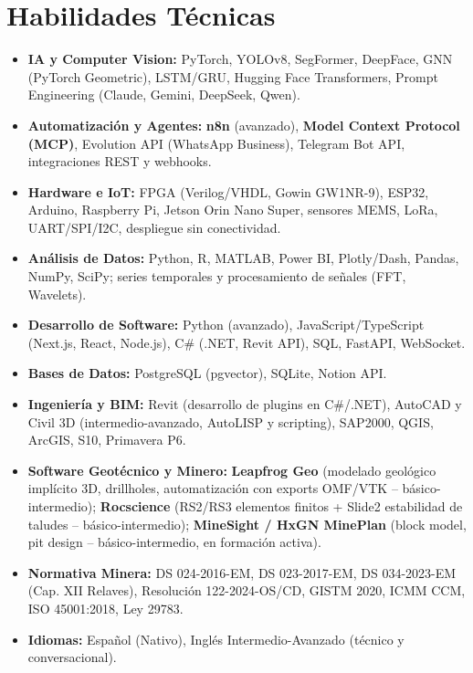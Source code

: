 \documentclass[10pt, a4paper]{article}
\begin{document}
\section*{Habilidades Técnicas}
\begin{itemize}
    \item \textbf{IA y Computer Vision:} PyTorch, YOLOv8, SegFormer, DeepFace, GNN (PyTorch Geometric), LSTM/GRU, Hugging Face Transformers, Prompt Engineering (Claude, Gemini, DeepSeek, Qwen).
    \item \textbf{Automatización y Agentes:} \textbf{n8n} (avanzado), \textbf{Model Context Protocol (MCP)}, Evolution API (WhatsApp Business), Telegram Bot API, integraciones REST y webhooks.
    \item \textbf{Hardware e IoT:} FPGA (Verilog/VHDL, Gowin GW1NR-9), ESP32, Arduino, Raspberry Pi, Jetson Orin Nano Super, sensores MEMS, LoRa, UART/SPI/I2C, despliegue sin conectividad.
    \item \textbf{Análisis de Datos:} Python, R, MATLAB, Power BI, Plotly/Dash, Pandas, NumPy, SciPy; series temporales y procesamiento de señales (FFT, Wavelets).
    \item \textbf{Desarrollo de Software:} Python (avanzado), JavaScript/TypeScript (Next.js, React, Node.js), C\# (.NET, Revit API), SQL, FastAPI, WebSocket.
    \item \textbf{Bases de Datos:} PostgreSQL (pgvector), SQLite, Notion API.
    \item \textbf{Ingeniería y BIM:} Revit (desarrollo de plugins en C\#/.NET), AutoCAD y Civil 3D (intermedio-avanzado, AutoLISP y scripting), SAP2000, QGIS, ArcGIS, S10, Primavera P6.
    \item \textbf{Software Geotécnico y Minero:} \textbf{Leapfrog Geo} (modelado geológico implícito 3D, drillholes, automatización con exports OMF/VTK -- básico-intermedio); \textbf{Rocscience} (RS2/RS3 elementos finitos + Slide2 estabilidad de taludes -- básico-intermedio); \textbf{MineSight / HxGN MinePlan} (block model, pit design -- básico-intermedio, en formación activa).
    \item \textbf{Normativa Minera:} DS 024-2016-EM, DS 023-2017-EM, DS 034-2023-EM (Cap. XII Relaves), Resolución 122-2024-OS/CD, GISTM 2020, ICMM CCM, ISO 45001:2018, Ley 29783.
    \item \textbf{Idiomas:} Español (Nativo), Inglés Intermedio-Avanzado (técnico y conversacional).
\end{itemize}

\end{document}

